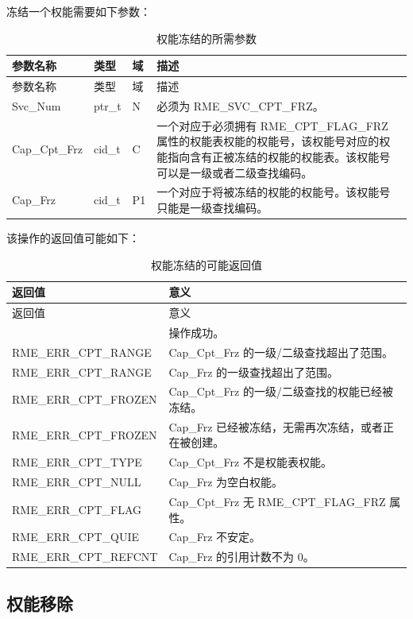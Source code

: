 冻结一个权能需要如下参数：

\begin{xltabular}{\textwidth}{@{}>{\hsize\raggedright\arraybackslash}X>{\hsize\raggedright\arraybackslash}X>{\hsize\raggedright\arraybackslash}X>{\hsize\raggedright\arraybackslash}X@{}}
\caption{权能冻结的所需参数}\label{tab:2-11-capability-freeze-parameters}\\
\toprule
参数名称 & 类型 & 域 & 描述\tabularnewline
\endfirsthead
\toprule
参数名称 & 类型 & 域 & 描述\tabularnewline
\midrule
\endhead
\bottomrule
\endlastfoot
Svc\_Num & ptr\_t & N & 必须为 RME\_SVC\_CPT\_FRZ。\tabularnewline
Cap\_Cpt\_Frz & cid\_t & C &
一个对应于必须拥有 RME\_CPT\_FLAG\_FRZ 属性的权能表权能的权能号，该权能号对应的权能指向含有正被冻结的权能的权能表。该权能号可以是一级或者二级查找编码。\tabularnewline
Cap\_Frz & cid\_t & P1 &
一个对应于将被冻结的权能的权能号。该权能号只能是一级查找编码。\tabularnewline
\end{xltabular}

该操作的返回值可能如下：

\begin{xltabular}{\textwidth}{@{}>{\hsize\raggedright\arraybackslash}X>{\hsize\raggedright\arraybackslash}X@{}}
\caption{权能冻结的可能返回值}\label{tab:2-12-capability-freeze-return-values}\\
\toprule
返回值 & 意义\tabularnewline
\endfirsthead
\toprule
返回值 & 意义\tabularnewline
\midrule
\endhead
\bottomrule
{} & 操作成功。\tabularnewline
    RME\_ERR\_CPT\_RANGE & Cap\_Cpt\_Frz 的一级/二级查找超出了范围。\tabularnewline
    RME\_ERR\_CPT\_RANGE & Cap\_Frz 的一级查找超出了范围。\tabularnewline
    RME\_ERR\_CPT\_FROZEN & Cap\_Cpt\_Frz 的一级/二级查找的权能已经被冻结。\tabularnewline
    RME\_ERR\_CPT\_FROZEN & Cap\_Frz 已经被冻结，无需再次冻结，或者正在被创建。\tabularnewline
    RME\_ERR\_CPT\_TYPE & Cap\_Cpt\_Frz 不是权能表权能。\tabularnewline
    RME\_ERR\_CPT\_NULL & Cap\_Frz 为空白权能。\tabularnewline
    RME\_ERR\_CPT\_FLAG & Cap\_Cpt\_Frz 无 RME\_CPT\_FLAG\_FRZ 属性。\tabularnewline
    RME\_ERR\_CPT\_QUIE & Cap\_Frz 不安定。\tabularnewline
    RME\_ERR\_CPT\_REFCNT & Cap\_Frz 的引用计数不为 0。\tabularnewline
\end{xltabular}

\subsection{权能移除}\label{subsec:2-remove-a-capability}


